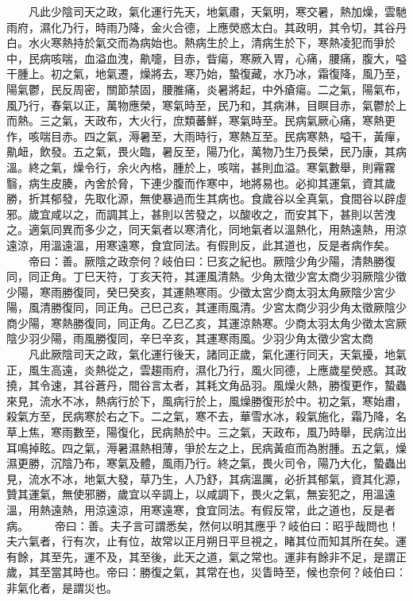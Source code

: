 　　凡此少陰司天之政，氣化運行先天，地氣肅，天氣明，寒交暑，熱加燥，雲馳雨府，濕化乃行，時雨乃降，金火合德，上應熒惑太白。其政明，其令切，其谷丹白。水火寒熱持於氣交而為病始也。熱病生於上，清病生於下，寒熱凌犯而爭於中，民病咳喘，血溢血洩，鼽嚏，目赤，眥瘍，寒厥入胃，心痛，腰痛，腹大，嗌干腫上。初之氣，地氣遷，燥將去，寒乃始，蟄復藏，水乃冰，霜復降，風乃至，陽氣鬱，民反周密，關節禁固，腰脽痛，炎暑將起，中外瘡瘍。二之氣，陽氣布，風乃行，春氣以正，萬物應榮，寒氣時至，民乃和，其病淋，目瞑目赤，氣鬱於上而熱。三之氣，天政布，大火行，庶類蕃鮮，寒氣時至。民病氣厥心痛，寒熱更作，咳喘目赤。四之氣，溽暑至，大雨時行，寒熱互至。民病寒熱，嗌干，黃癉，鼽衄，飲發。五之氣，畏火臨，暑反至，陽乃化，萬物乃生乃長榮，民乃康，其病溫。終之氣，燥令行，余火內格，腫於上，咳喘，甚則血溢。寒氣數舉，則霿霧翳，病生皮腠，內舍於脅，下連少腹而作寒中，地將易也。必抑其運氣，資其歲勝，折其郁發，先取化源，無使暴過而生其病也。食歲谷以全真氣，食間谷以辟虛邪。歲宜咸以之，而調其上，甚則以苦發之，以酸收之，而安其下，甚則以苦洩之。適氣同異而多少之，同天氣者以寒清化，同地氣者以溫熱化，用熱遠熱，用涼遠涼，用溫遠溫，用寒遠寒，食宜同法。有假則反，此其道也，反是者病作矣。
　　帝曰：善。厥陰之政奈何？岐伯曰：巳亥之紀也。厥陰少角少陽，清熱勝復同，同正角。丁巳天符，丁亥天符，其運風清熱。少角太徵少宮太商少羽厥陰少徵少陽，寒雨勝復同，癸巳癸亥，其運熱寒雨。少徵太宮少商太羽太角厥陰少宮少陽，風清勝復同，同正角。己巳己亥，其運雨風清。少宮太商少羽少角太徵厥陰少商少陽，寒熱勝復同，同正角。乙巳乙亥，其運涼熱寒。少商太羽太角少徵太宮厥陰少羽少陽，雨風勝復同，辛巳辛亥，其運寒雨風。少羽少角太徵少宮太商
　　凡此厥陰司天之政，氣化運行後天，諸同正歲，氣化運行同天，天氣擾，地氣正，風生高遠，炎熱從之，雲趨雨府，濕化乃行，風火同德，上應歲星熒惑。其政撓，其令速，其谷蒼丹，間谷言太者，其耗文角品羽。風燥火熱，勝復更作，蟄蟲來見，流水不冰，熱病行於下，風病行於上，風燥勝復形於中。初之氣，寒始肅，殺氣方至，民病寒於右之下。二之氣，寒不去，華雪水冰，殺氣施化，霜乃降，名草上焦，寒雨數至，陽復化，民病熱於中。三之氣，天政布，風乃時舉，民病泣出耳鳴掉眩。四之氣，溽暑濕熱相薄，爭於左之上，民病黃疸而為胕腫。五之氣，燥濕更勝，沉陰乃布，寒氣及體，風雨乃行。終之氣，畏火司令，陽乃大化，蟄蟲出見，流水不冰，地氣大發，草乃生，人乃舒，其病溫厲，必折其郁氣，資其化源，贊其運氣，無使邪勝，歲宜以辛調上，以咸調下，畏火之氣，無妄犯之，用溫遠溫，用熱遠熱，用涼遠涼，用寒遠寒，食宜同法。有假反常，此之道也，反是者病。
　　帝曰：善。夫子言可謂悉矣，然何以明其應乎？岐伯曰：昭乎哉問也！夫六氣者，行有次，止有位，故常以正月朔日平旦視之，睹其位而知其所在矣。運有餘，其至先，運不及，其至後，此天之道，氣之常也。運非有餘非不足，是謂正歲，其至當其時也。帝曰：勝復之氣，其常在也，災眚時至，候也奈何？岐伯曰：非氣化者，是謂災也。
